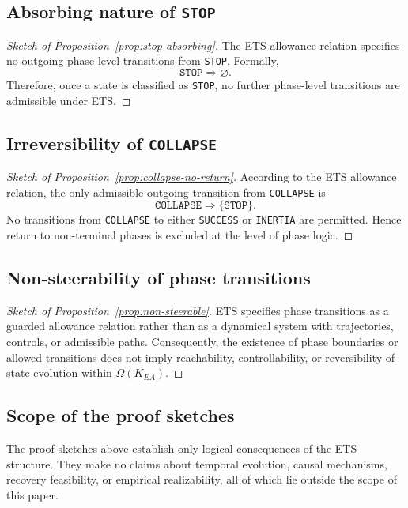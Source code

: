 \subsection{Absorbing nature of \texttt{STOP}}

\begin{proof}[Sketch of Proposition~\ref{prop:stop-absorbing}]
The ETS allowance relation specifies no outgoing phase-level transitions
from \texttt{STOP}. Formally,
\[
\texttt{STOP} \Rightarrow \varnothing .
\]
Therefore, once a state is classified as \texttt{STOP}, no further
phase-level transitions are admissible under ETS.
\end{proof}

\subsection{Irreversibility of \texttt{COLLAPSE}}

\begin{proof}[Sketch of Proposition~\ref{prop:collapse-no-return}]
According to the ETS allowance relation, the only admissible outgoing
transition from \texttt{COLLAPSE} is
\[
\texttt{COLLAPSE} \Rightarrow \{\texttt{STOP}\}.
\]
No transitions from \texttt{COLLAPSE} to either \texttt{SUCCESS} or
\texttt{INERTIA} are permitted.
Hence return to non-terminal phases is excluded at the level of phase logic.
\end{proof}

\subsection{Non-steerability of phase transitions}

\begin{proof}[Sketch of Proposition~\ref{prop:non-steerable}]
ETS specifies phase transitions as a guarded allowance relation rather than
as a dynamical system with trajectories, controls, or admissible paths.
Consequently, the existence of phase boundaries or allowed transitions
does not imply reachability, controllability, or reversibility of state
evolution within $\Omega(K_{EA})$.
\end{proof}

\subsection{Scope of the proof sketches}

\begin{remark}
The proof sketches above establish only logical consequences of the ETS
structure. They make no claims about temporal evolution, causal mechanisms,
recovery feasibility, or empirical realizability, all of which lie outside
the scope of this paper.
\end{remark}
